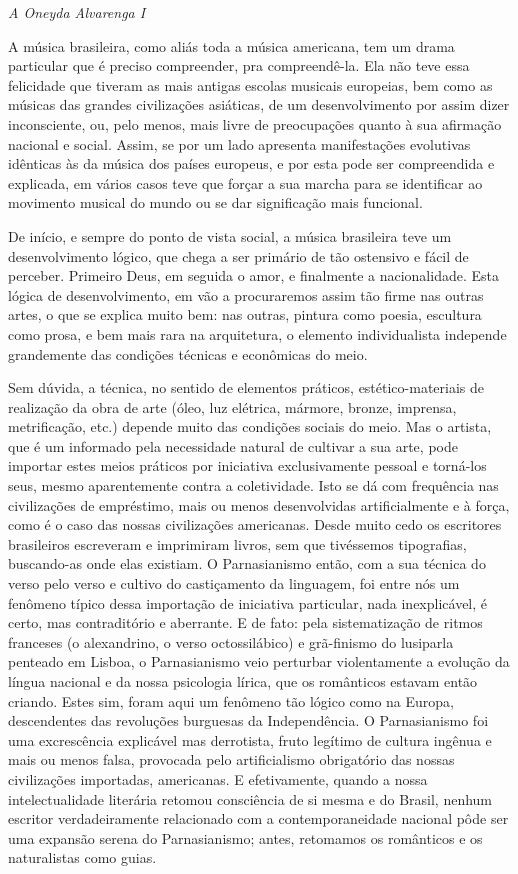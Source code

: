 \emph{A Oneyda Alvarenga I }

A música brasileira, como aliás toda a música americana, tem um drama
particular que é preciso compreender, pra compreendê-la. Ela não teve
essa felicidade que tiveram as mais antigas escolas musicais europeias,
bem como as músicas das grandes civilizações asiáticas, de um
desenvolvimento por assim dizer inconsciente, ou, pelo menos, mais livre
de preocupações quanto à sua afirmação nacional e social. Assim, se por
um lado apresenta manifestações evolutivas idênticas às da música dos
países europeus, e por esta pode ser compreendida e explicada, em vários
casos teve que forçar a sua marcha para se identificar ao movimento
musical do mundo ou se dar significação mais funcional.

De início, e sempre do ponto de vista social, a música brasileira teve
um desenvolvimento lógico, que chega a ser primário de tão ostensivo e
fácil de perceber. Primeiro Deus, em seguida o amor, e finalmente a
nacionalidade. Esta lógica de desenvolvimento, em vão a procuraremos
assim tão firme nas outras artes, o que se explica muito bem: nas
outras, pintura como poesia, escultura como prosa, e bem mais rara na
arquitetura, o elemento individualista independe grandemente das
condições técnicas e econômicas do meio.

Sem dúvida, a técnica, no sentido de elementos práticos,
estético-materiais de realização da obra de arte (óleo, luz elétrica,
mármore, bronze, imprensa, metrificação, etc.) depende muito das
condições sociais do meio. Mas o artista, que é um informado pela
necessidade natural de cultivar a sua arte, pode importar estes meios
práticos por iniciativa exclusivamente pessoal e torná-los seus, mesmo
aparentemente contra a coletividade. Isto se dá com frequência nas
civilizações de empréstimo, mais ou menos desenvolvidas artificialmente
e à força, como é o caso das nossas civilizações americanas. Desde muito
cedo os escritores brasileiros escreveram e imprimiram livros, sem que
tivéssemos tipografias, buscando-as onde elas existiam. O Parnasianismo
então, com a sua técnica do verso pelo verso e cultivo do castiçamento
da linguagem, foi entre nós um fenômeno típico dessa importação de
iniciativa particular, nada inexplicável, é certo, mas contraditório e
aberrante. E de fato: pela sistematização de ritmos franceses (o
alexandrino, o verso octossilábico) e grã-finismo do lusiparla penteado
em Lisboa, o Parnasianismo veio perturbar violentamente a evolução da
língua nacional e da nossa psicologia lírica, que os românticos estavam
então criando. Estes sim, foram aqui um fenômeno tão lógico como na
Europa, descendentes das revoluções burguesas da Independência. O
Parnasianismo foi uma excrescência explicável mas derrotista, fruto
legítimo de cultura ingênua e mais ou menos falsa, provocada pelo
artificialismo obrigatório das nossas civilizações importadas,
americanas. E efetivamente, quando a nossa intelectualidade literária
retomou consciência de si mesma e do Brasil, nenhum escritor
verdadeiramente relacionado com a contemporaneidade nacional pôde ser
uma expansão serena do Parnasianismo; antes, retomamos os românticos e
os naturalistas como guias.

